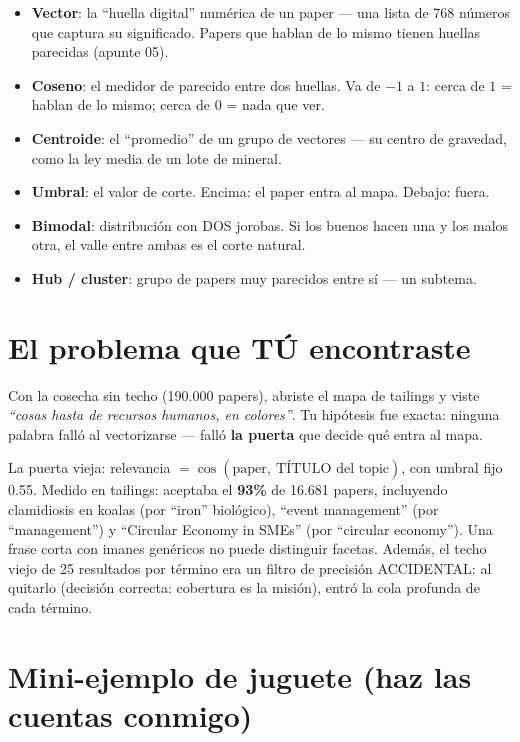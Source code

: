 \documentclass[11pt,a4paper]{article}
\begin{document}
\begin{itemize}
  \item \textbf{Vector}: la ``huella digital'' numérica de un paper --- una lista de 768
        números que captura su significado. Papers que hablan de lo mismo tienen huellas
        parecidas (apunte 05).
  \item \textbf{Coseno}: el medidor de parecido entre dos huellas. Va de $-1$ a $1$:
        cerca de $1$ = hablan de lo mismo; cerca de $0$ = nada que ver.
  \item \textbf{Centroide}: el ``promedio'' de un grupo de vectores --- su centro de
        gravedad, como la ley media de un lote de mineral.
  \item \textbf{Umbral}: el valor de corte. Encima: el paper entra al mapa. Debajo: fuera.
  \item \textbf{Bimodal}: distribución con DOS jorobas. Si los buenos hacen una y los
        malos otra, el valle entre ambas es el corte natural.
  \item \textbf{Hub / cluster}: grupo de papers muy parecidos entre sí --- un subtema.
\end{itemize}

\section{El problema que TÚ encontraste}

Con la cosecha sin techo (190.000 papers), abriste el mapa de tailings y viste
\emph{``cosas hasta de recursos humanos, en colores''}. Tu hipótesis fue exacta: ninguna
palabra falló al vectorizarse --- falló \textbf{la puerta} que decide qué entra al mapa.

La puerta vieja: relevancia $= \cos(\mbox{paper},\ \mbox{TÍTULO del topic})$, con
umbral fijo 0.55. Medido en tailings: aceptaba el \textbf{93\%} de 16.681 papers,
incluyendo clamidiosis en koalas (por ``iron'' biológico), ``event management'' (por
``management'') y ``Circular Economy in SMEs'' (por ``circular economy''). Una frase
corta con imanes genéricos no puede distinguir facetas. Además, el techo viejo de 25
resultados por término era un filtro de precisión ACCIDENTAL: al quitarlo (decisión
correcta: cobertura es la misión), entró la cola profunda de cada término.

\section{Mini-ejemplo de juguete (haz las cuentas conmigo)}
\end{document}
